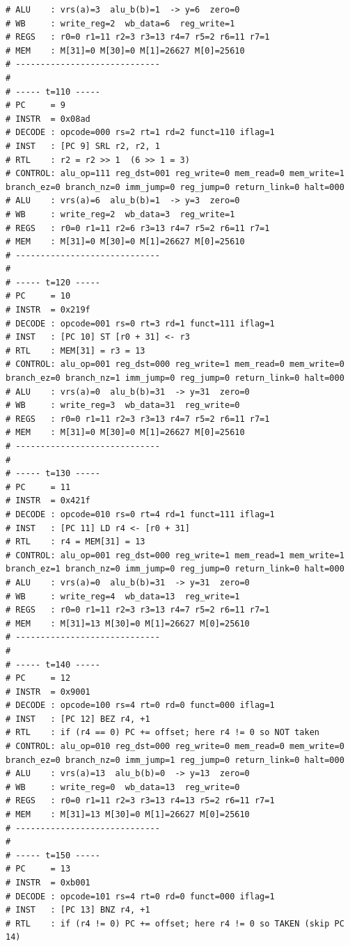 \documentclass[12pt]{report}
\begin{document}
\begin{lstlisting}
# ALU    : vrs(a)=3  alu_b(b)=1  -> y=6  zero=0
# WB     : write_reg=2  wb_data=6  reg_write=1
# REGS   : r0=0 r1=11 r2=3 r3=13 r4=7 r5=2 r6=11 r7=1
# MEM    : M[31]=0 M[30]=0 M[1]=26627 M[0]=25610
# -----------------------------
# 
# ----- t=110 -----
# PC     = 9
# INSTR  = 0x08ad
# DECODE : opcode=000 rs=2 rt=1 rd=2 funct=110 iflag=1
# INST   : [PC 9] SRL r2, r2, 1
# RTL    : r2 = r2 >> 1  (6 >> 1 = 3)
# CONTROL: alu_op=111 reg_dst=001 reg_write=0 mem_read=0 mem_write=1 branch_ez=0 branch_nz=0 imm_jump=0 reg_jump=0 return_link=0 halt=000
# ALU    : vrs(a)=6  alu_b(b)=1  -> y=3  zero=0
# WB     : write_reg=2  wb_data=3  reg_write=1
# REGS   : r0=0 r1=11 r2=6 r3=13 r4=7 r5=2 r6=11 r7=1
# MEM    : M[31]=0 M[30]=0 M[1]=26627 M[0]=25610
# -----------------------------
# 
# ----- t=120 -----
# PC     = 10
# INSTR  = 0x219f
# DECODE : opcode=001 rs=0 rt=3 rd=1 funct=111 iflag=1
# INST   : [PC 10] ST [r0 + 31] <- r3
# RTL    : MEM[31] = r3 = 13
# CONTROL: alu_op=001 reg_dst=000 reg_write=1 mem_read=0 mem_write=0 branch_ez=0 branch_nz=1 imm_jump=0 reg_jump=0 return_link=0 halt=000
# ALU    : vrs(a)=0  alu_b(b)=31  -> y=31  zero=0
# WB     : write_reg=3  wb_data=31  reg_write=0
# REGS   : r0=0 r1=11 r2=3 r3=13 r4=7 r5=2 r6=11 r7=1
# MEM    : M[31]=0 M[30]=0 M[1]=26627 M[0]=25610
# -----------------------------
# 
# ----- t=130 -----
# PC     = 11
# INSTR  = 0x421f
# DECODE : opcode=010 rs=0 rt=4 rd=1 funct=111 iflag=1
# INST   : [PC 11] LD r4 <- [r0 + 31]
# RTL    : r4 = MEM[31] = 13
# CONTROL: alu_op=001 reg_dst=000 reg_write=1 mem_read=1 mem_write=1 branch_ez=1 branch_nz=0 imm_jump=0 reg_jump=0 return_link=0 halt=000
# ALU    : vrs(a)=0  alu_b(b)=31  -> y=31  zero=0
# WB     : write_reg=4  wb_data=13  reg_write=1
# REGS   : r0=0 r1=11 r2=3 r3=13 r4=7 r5=2 r6=11 r7=1
# MEM    : M[31]=13 M[30]=0 M[1]=26627 M[0]=25610
# -----------------------------
# 
# ----- t=140 -----
# PC     = 12
# INSTR  = 0x9001
# DECODE : opcode=100 rs=4 rt=0 rd=0 funct=000 iflag=1
# INST   : [PC 12] BEZ r4, +1
# RTL    : if (r4 == 0) PC += offset; here r4 != 0 so NOT taken
# CONTROL: alu_op=010 reg_dst=000 reg_write=0 mem_read=0 mem_write=0 branch_ez=0 branch_nz=0 imm_jump=1 reg_jump=0 return_link=0 halt=000
# ALU    : vrs(a)=13  alu_b(b)=0  -> y=13  zero=0
# WB     : write_reg=0  wb_data=13  reg_write=0
# REGS   : r0=0 r1=11 r2=3 r3=13 r4=13 r5=2 r6=11 r7=1
# MEM    : M[31]=13 M[30]=0 M[1]=26627 M[0]=25610
# -----------------------------
# 
# ----- t=150 -----
# PC     = 13
# INSTR  = 0xb001
# DECODE : opcode=101 rs=4 rt=0 rd=0 funct=000 iflag=1
# INST   : [PC 13] BNZ r4, +1
# RTL    : if (r4 != 0) PC += offset; here r4 != 0 so TAKEN (skip PC 14)

\end{lstlisting}
\end{document}

